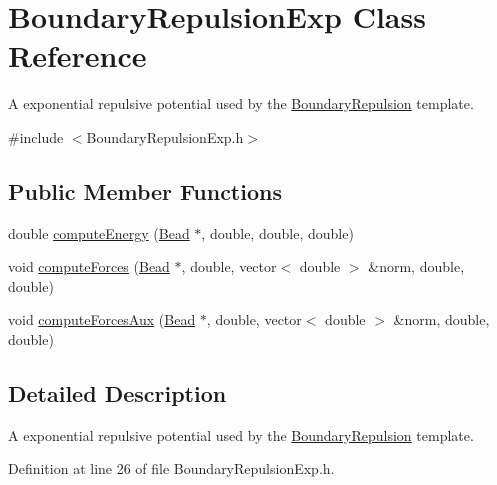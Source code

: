 \hypertarget{classBoundaryRepulsionExp}{\section{Boundary\+Repulsion\+Exp Class Reference}
\label{classBoundaryRepulsionExp}
}


A exponential repulsive potential used by the \hyperlink{classBoundaryRepulsion}{Boundary\+Repulsion} template.  




{\ttfamily \#include $<$Boundary\+Repulsion\+Exp.\+h$>$}

\subsection*{Public Member Functions}
\begin{DoxyCompactItemize}
\item 
double \hyperlink{classBoundaryRepulsionExp_a43ddf5cd299610b06bf95d30e87c7310}{compute\+Energy} (\hyperlink{classBead}{Bead} $\ast$, double, double, double)
\item 
void \hyperlink{classBoundaryRepulsionExp_a4c837a8b9a90b3987cfb1a7000c4163c}{compute\+Forces} (\hyperlink{classBead}{Bead} $\ast$, double, vector$<$ double $>$ \&norm, double, double)
\item 
void \hyperlink{classBoundaryRepulsionExp_aa0da9a38c4a9dfcca390ea8350fde2b4}{compute\+Forces\+Aux} (\hyperlink{classBead}{Bead} $\ast$, double, vector$<$ double $>$ \&norm, double, double)
\end{DoxyCompactItemize}


\subsection{Detailed Description}
A exponential repulsive potential used by the \hyperlink{classBoundaryRepulsion}{Boundary\+Repulsion} template. 

Definition at line 26 of file Boundary\+Repulsion\+Exp.\+h.



